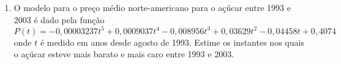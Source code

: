 \documentclass[a4paper,5pt]{amsbook}
\begin{document}
\begin{enumerate}
    \vspace{0.5cm}
    \item O modelo para o pre\c{c}o m\'edio norte-americano para o a\c{c}\'ucar entre 1993
	    e 2003 \'e dado pela fun\c{c}\~ao \[P(t) = -0,00003237t^5 + 0,0009037t^4
		- 0,008956t^3 + 0,03629t^2 - 0,04458t + 0,4074\] onde $t$ \'e
		medido em anos desde agosto de 1993. Estime os instantes nos
		quais o a\c{c}\'ucar esteve mais barato e mais caro entre 1993 e
		2003.
\end{enumerate}
\end{document}
